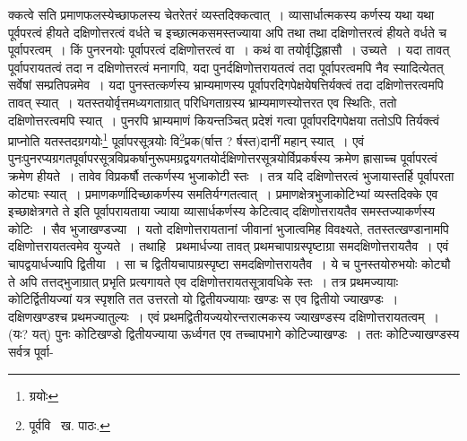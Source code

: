 \documentclass[11pt, openany]{book}
\begin{document}
\noindent क्कत्वे सति प्रमाणफलस्येच्छाफलस्य चेतरेतरं व्यस्तदिक्कत्वात्~। व्यासार्धात्मकस्य कर्णस्य यथा यथा पूर्वपरत्वं हीयते दक्षिणोत्तरत्वं वर्धते च इच्छात्मकसमस्तज्याया अपि तथा तथा दक्षिणोत्तरत्वं हीयते वर्धते च पूर्वापरत्वम्~। किं पुनरनयोः पूर्वापरत्वं दक्षिणोत्तरत्वं वा~। कथं वा
तयोर्वृद्धिह्रासौ~। उच्यते~। यदा तावत् पूर्वापरायतत्वं तदा न दक्षिणोत्तरत्वं मनागपि, यदा पुनर्दक्षिणोत्तरायतत्वं तदा पूर्वापरत्वमपि नैव
स्यादित्येतत् सर्वेषां सम्प्रतिपन्नमेव~। यदा पुनस्तत्कर्णस्य भ्राम्यमाणस्य पूर्वापरदिगपेक्षयेषत्तिर्यक्त्वं तदा दक्षिणोत्तरत्वमपि तावत् स्यात्~।
यतस्तयोर्वृत्तमध्यगताग्रात् परिधिगताग्रस्य भ्राम्यमाणस्योत्तरत एव स्थितिः, ततो दक्षिणोत्तरत्वमपि स्यात्~। पुनरपि भ्राम्यमाणं कियन्तञ्चित् प्रदेशं गत्वा पूर्वापरदिगपेक्षया ततोऽपि तिर्यक्त्वं प्राप्नोति यतस्तदग्रगयोः\renewcommand{\thefootnote}{१}\footnote{ग्रयोः} पूर्वापरसूत्रयोः वि\renewcommand{\thefootnote}{२}\footnote{पूर्ववि \textendash\ ख. पाठः.}प्रक(र्षात्त ? र्षस्त)दानीं महान् स्यात्~। एवं पुनःपुनरप्यग्रगतपूर्वापरसूत्रविप्रकर्षानुरूपमग्रद्वयगतयोर्दक्षिणोत्तरसूत्रयोर्विप्रकर्षस्य क्रमेण ह्रासाच्च पूर्वापरत्वं क्रमेण हीयते~। तावेव विप्रकर्षौ तत्कर्णस्य भुजाकोटी स्तः~। तत्र यदि दक्षिणोत्तरत्वं भुजायास्तर्हि पूर्वापरता कोट्याः स्यात्~। प्रमाणकर्णादिच्छाकर्णस्य समतिर्यग्गतत्वात्~। प्रमाणक्षेत्रभुजाकोटिभ्यां व्यस्तदिक्के एव इच्छाक्षेत्रगते ते इति पूर्वापरायताया ज्याया व्यासार्धकर्णस्य केटित्वाद् दक्षिणोत्तरायतैव समस्तज्याकर्णस्य कोटिः~। सैव भुजाखण्डज्या~। यतो दक्षिणोत्तरायतानां जीवानां भुजात्वमिह विवक्ष्यते, ततस्तत्खण्डानामपि दक्षिणोत्तरायतत्वमेव युज्यते~। तथाहि \textendash\ प्रथमार्धज्या तावत् प्रथमचापाग्रस्पृष्टाग्रा समदक्षिणोत्तरायतैव~। एवं चापद्वयार्धज्यापि द्वितीया~। सा च द्वितीयचापाग्रस्पृष्टा समदक्षिणोत्तरायतैव~। ये च पुनस्तयोरुभयोः कोट्यौ ते अपि तत्तद्भुजाग्रात् प्रभृति प्रत्यगायते एव दक्षिणोत्तरायतसूत्रावधिके स्तः~। तत्र प्रथमज्यायाः कोटिर्द्वितीयज्यां यत्र स्पृशति तत उत्तरतो यो द्वितीयज्यायाः खण्डः स एव द्वितीयो ज्याखण्डः~। दक्षिणखण्डश्च प्रथमज्यातुल्यः~। एवं प्रथमद्वितीयज्ययोरन्तरात्मकस्य ज्याखण्डस्य दक्षिणोत्तरायतत्वम्~। (यः? यत्) पुनः कोटिखण्डो द्वितीयज्याया ऊर्ध्वगत एव तच्चापभागे कोटिज्याखण्डः~। ततः कोटिज्याखण्डस्य सर्वत्र पूर्वा-

\newpage
\end{document}
